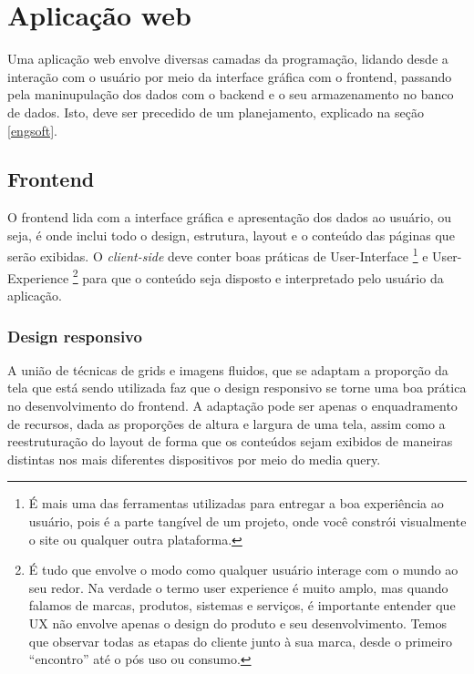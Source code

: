 \section{Aplicação web}
Uma aplicação web envolve diversas camadas da programação, lidando desde a interação com o usuário por meio da interface gráfica com o frontend, passando pela maninupulação dos dados com o backend e o seu armazenamento no banco de dados. Isto, deve ser precedido de um planejamento, explicado na seção \ref{engsoft}.

\subsection{Frontend}
O frontend lida com a interface gráfica e apresentação dos dados ao usuário, ou seja, é onde inclui todo o design, estrutura, layout e o conteúdo das páginas que serão exibidas. O \textit{client-side} deve conter boas práticas de User-Interface
\footnote{É mais uma das ferramentas utilizadas para entregar a boa experiência ao usuário, pois é a parte tangível de um projeto, onde você constrói visualmente o site ou qualquer outra plataforma.}
e User-Experience
\footnote{É tudo que envolve o modo como qualquer usuário interage com o mundo ao seu redor. Na verdade o termo user experience é muito amplo, mas quando falamos de marcas, produtos, sistemas e serviços, é importante entender que UX não envolve apenas o design do produto e seu desenvolvimento. Temos que observar todas as etapas do cliente junto à sua marca, desde o primeiro “encontro” até o pós uso ou consumo.} 
para que o conteúdo seja disposto e interpretado pelo usuário da aplicação. \cite{SOUTO}

\subsubsection{Design responsivo}
A união de técnicas de grids e imagens fluidos, que se adaptam a proporção da tela que está sendo utilizada faz que o design responsivo se torne uma boa prática no desenvolvimento do frontend. A adaptação pode ser apenas o enquadramento de recursos, dada as proporções de altura e largura de uma tela, assim como a reestruturação do layout de forma que os conteúdos sejam exibidos de maneiras distintas nos mais diferentes dispositivos por meio do media query. \cite{MOZILA}


